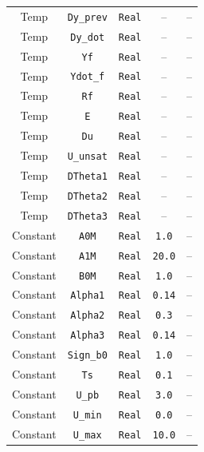 \begin{center}
\begin{longtable}{c c c c c}
    Temp & \texttt{Dy\_prev} & \texttt{Real} & -- & -- \\ %
    Temp & \texttt{Dy\_dot} & \texttt{Real} & -- & -- \\ %
    Temp & \texttt{Yf} & \texttt{Real} & -- & -- \\ %
    Temp & \texttt{Ydot\_f} & \texttt{Real} & -- & -- \\ %
    Temp & \texttt{Rf} & \texttt{Real} & -- & -- \\ %
    Temp & \texttt{E} & \texttt{Real} & -- & -- \\ %
    Temp & \texttt{Du} & \texttt{Real} & -- & -- \\ %
    Temp & \texttt{U\_unsat} & \texttt{Real} & -- & -- \\ %
    Temp & \texttt{DTheta1} & \texttt{Real} & -- & -- \\ %
    Temp & \texttt{DTheta2} & \texttt{Real} & -- & -- \\ %
    Temp & \texttt{DTheta3} & \texttt{Real} & -- & -- \\ %

    Constant & \texttt{A0M} & \texttt{Real} & \texttt{1.0} & -- \\ %
    Constant & \texttt{A1M} & \texttt{Real} & \texttt{20.0} & -- \\ %
    Constant & \texttt{B0M} & \texttt{Real} & \texttt{1.0} & -- \\ %
    Constant & \texttt{Alpha1} & \texttt{Real} & \texttt{0.14} & -- \\ %
    Constant & \texttt{Alpha2} & \texttt{Real} & \texttt{0.3} & -- \\ %
    Constant & \texttt{Alpha3} & \texttt{Real} & \texttt{0.14} & -- \\ %
    Constant & \texttt{Sign\_b0} & \texttt{Real} & \texttt{1.0} & -- \\ %
    Constant & \texttt{Ts} & \texttt{Real} & \texttt{0.1} & -- \\ %
    Constant & \texttt{U\_pb} & \texttt{Real} & \texttt{3.0} & -- \\ %
    Constant & \texttt{U\_min} & \texttt{Real} & \texttt{0.0} & -- \\ %
    Constant & \texttt{U\_max} & \texttt{Real} & \texttt{10.0} & -- \\ %
\end{longtable}



\end{center}

